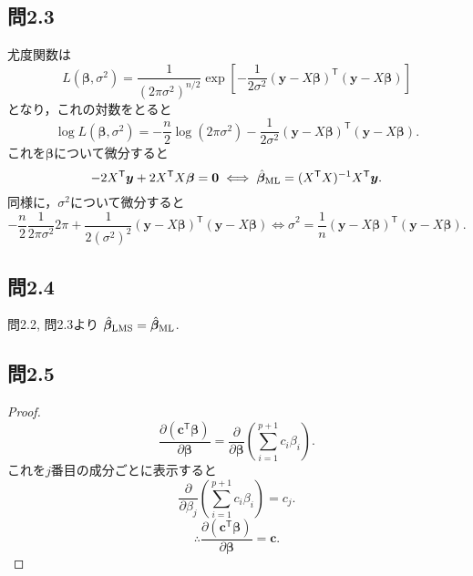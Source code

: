 \documentclass[pdflatex,ja=standard]{bxjsarticle}
\begin{document}
\subsection*{問2.3}
尤度関数は
\begin{equation}
L(\bm{\beta}, \sigma^2) = \frac{1}{(2 \pi \sigma^2)^{n/2}} \exp \left[ -\frac{1}{2 \sigma^2} (\bm{y} - X \bm{\beta})^{\mathsf{T}} (\bm{y} - X \bm{\beta}) \right]
\end{equation}
となり，これの対数をとると
\begin{equation}
\log L(\bm{\beta}, \sigma^2) = - \frac{n}{2} \log (2 \pi \sigma^2)  -\frac{1}{2 \sigma^2} (\bm{y} - X \bm{\beta})^{\mathsf{T}} (\bm{y} - X \bm{\beta}) .
\end{equation}
これを$\bm{\beta}$について微分すると
\begin{equation}
- 2 X^{\mathsf{T}} \bm{y} + 2 X^{\mathsf{T}}X \bm{\beta} = \bm{0}
\iff \hat{\bm{\beta}}_{\rm{ML}} = (X^{\mathsf{T}} X)^{-1} X^{\mathsf{T}} \bm{y}.
\end{equation}
同様に，$\sigma^2$について微分すると
\begin{equation}
- \frac{n}{2} \frac{1}{2 \pi \sigma^2}  2 \pi + \frac{1}{2 (\sigma^2)^2} (\bm{y} - X \bm{\beta})^{\mathsf{T}} (\bm{y} - X \bm{\beta})
\iff \hat{\sigma}^2 = \frac{1}{n} (\bm{y} - X \bm{\beta})^{\mathsf{T}} (\bm{y} - X \bm{\beta}).
\end{equation}

\subsection*{問2.4}
問2.2, 問2.3より $\hat{\bm{\beta}}_{\rm{LMS}} = \hat{\bm{\beta}}_{\rm{ML}}$. 

\subsection*{問2.5}
\begin{proof}
\begin{equation}
\frac{\partial (\bm{c}^{\mathsf{T}} \bm{\beta})}{\partial \bm{\beta}} = \frac{\partial }{\partial \bm{\beta}} \left( \sum_{i=1}^{p+1} c_i \beta_i \right).
\end{equation}
これを$j$番目の成分ごとに表示すると
\begin{equation}
\frac{\partial }{\partial \beta_j} \left( \sum_{i=1}^{p+1} c_i \beta_i \right) = c_j.
\end{equation}
\begin{equation}
\therefore \frac{\partial (\bm{c}^{\mathsf{T}} \bm{\beta})}{\partial \bm{\beta}} = \bm{c}.
\end{equation}
\end{proof}
\end{document}
